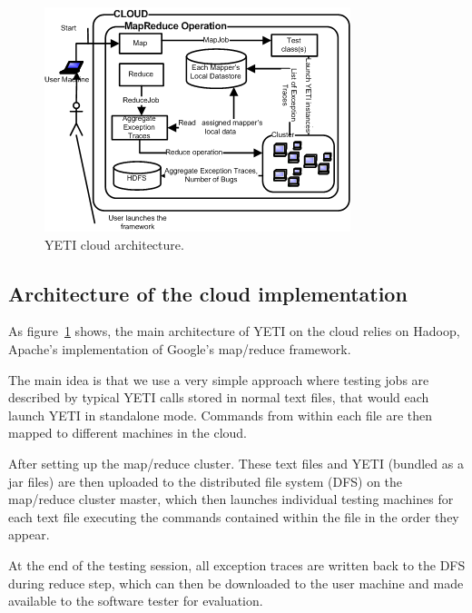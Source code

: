 \begin{figure}[h]
\begin{center}
\includegraphics[width=\columnwidth]{images/YetiCloud.png}
\end{center}
\caption{YETI cloud architecture.}\label{fig:architecture}
\end{figure}


\subsection{Architecture of the cloud implementation}

As figure~\ref{fig:architecture} shows, the main architecture of YETI on the cloud 
relies on Hadoop, Apache's implementation of Google's map/reduce framework. 

The main idea is that we use a very simple approach where testing jobs 
are described by typical YETI calls stored in normal text files, that would each launch YETI in standalone mode. 
Commands from within each file are then mapped to different machines in the cloud. 

After setting up the map/reduce cluster. These text files and YETI (bundled as a jar files) are then uploaded to the 
distributed file system (DFS) on the map/reduce cluster master, which then launches individual testing machines 
for each text file executing the commands contained within the file in the order they appear.

At the end of the testing session, all exception traces are written back to the DFS during reduce step, which can then be downloaded to the 
user machine and made available to the software tester for evaluation.


